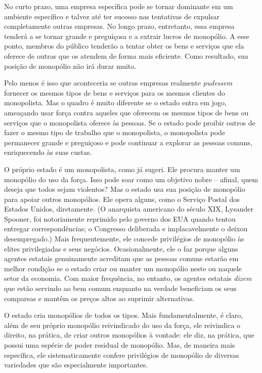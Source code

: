 No curto prazo, uma empresa específica pode se tornar dominante em um ambiente específico e talvez até ter sucesso nas tentativas de expulsar completamente outras empresas. No longo prazo, entretanto, essa empresa tenderá a se tornar grande e preguiçosa e a extrair lucros de monopólio. A esse ponto, membros do público tenderão a tentar obter os bens e serviços que ela oferece de outras que os atendem de forma mais eficiente. Como resultado, sua posição de monopólio não irá durar muito.

Pelo menos é isso que aconteceria se outras empresas realmente \emph{pudessem} fornecer os mesmos tipos de bens e serviços para os mesmos clientes do monopolista. Mas o quadro é muito diferente se o estado entra em jogo, ameaçando usar força contra aqueles que oferecem os mesmos tipos de bens ou serviços que o monopolista oferece às pessoas. Se o estado pode proibir outros de fazer o mesmo tipo de trabalho que o monopolista, o monopolista pode permanecer grande e preguiçoso e pode continuar a explorar as pessoas comuns, enriquecendo às suas custas.

O próprio estado é um monopolista, como já sugeri. Ele procura manter um monopólio do uso da força. Isso pode soar como um objetivo nobre -- afinal, quem deseja que todos sejam violentos? Mas o estado usa sua posição de monopólio para apoiar outros monopólios. Ele opera alguns, como o Serviço Postal dos Estados Unidos, diretamente. (O anarquista americano do século XIX, Lysander Spooner, foi notoriamente reprimido pelo governo dos EUA quando tentou entregar correspondências; o Congresso deliberada e implacavelmente o deixou desempregado.) Mais frequentemente, ele concede privilégios de monopólio às elites privilegiadas e seus negócios. Ocasionalmente, ele o faz porque alguns agentes estatais genuinamente acreditam que as pessoas comuns estarão em melhor condição se o estado criar ou manter um monopólio neste ou naquele setor da economia. Com maior frequência, no entanto, os agentes estatais \emph{dizem} que estão servindo ao bem comum enquanto na verdade beneficiam os seus comparsas e mantêm os preços altos ao suprimir alternativas.

O estado cria monopólios de todos os tipos. Mais fundamentalmente, é claro, além de seu próprio monopólio reivindicado do uso da força, ele reivindica o direito, na prática, de criar outros monopólios à vontade: ele diz, na prática, que possui uma espécie de poder residual de monopólio. Mas, de maneira mais específica, ele sistematicamente confere privilégios de monopólio de diversas variedades que são especialmente importantes.

